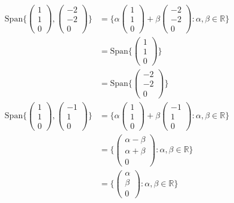 \documentclass[11pt]{report}
\newcommand*\Zb[1] {\mathbb{#1}}
\begin{document}
\begin{align}
 \text{Span}\{\begin{pmatrix} 1 \\ 1 \\ 0 \end{pmatrix}, \begin{pmatrix} -2 \\ -2 \\ 0 \end{pmatrix}\} &= \{\alpha \begin{pmatrix} 1 \\ 1 \\ 0 \end{pmatrix} + \beta \begin{pmatrix} -2 \\ -2 \\ 0 \end{pmatrix}: \alpha, \beta \in \Zb{R}\} \\
&= \text{Span}\{\begin{pmatrix} 1 \\ 1 \\ 0 \end{pmatrix}\} \\
&= \text{Span}\{\begin{pmatrix} -2 \\ -2 \\ 0 \end{pmatrix}\} \\
\text{Span}\{\begin{pmatrix} 1 \\ 1 \\ 0 \end{pmatrix}, \begin{pmatrix} -1 \\ 1 \\ 0 \end{pmatrix}\} &= \{\alpha \begin{pmatrix} 1 \\ 1 \\ 0 \end{pmatrix} + \beta \begin{pmatrix} -1 \\ 1 \\ 0 \end{pmatrix}: \alpha, \beta \in \Zb{R}\} \\
&= \{\begin{pmatrix} \alpha-\beta \\ \alpha+\beta \\ 0 \end{pmatrix}: \alpha, \beta \in \Zb{R}\} \\
&= \{\begin{pmatrix} \alpha \\ \beta \\ 0 \end{pmatrix}: \alpha, \beta \in \Zb{R}\}
\end{align}
\end{document}
